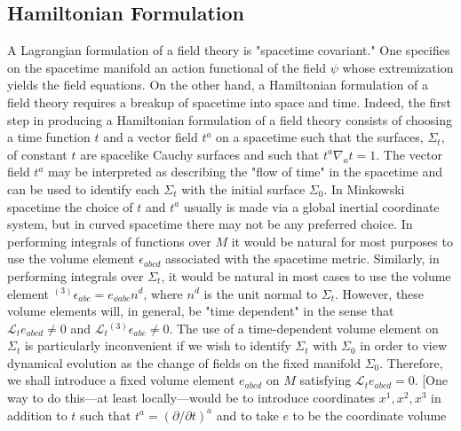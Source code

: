 
\subsection{Hamiltonian Formulation}\label{sec:E.2}

A Lagrangian formulation of a field theory is "spacetime covariant." One specifies
on the spacetime manifold an action functional of the field \(\psi\) whose
extremization yields the field equations. On the other hand, a Hamiltonian
formulation of a field theory requires a breakup of spacetime into space and time.
Indeed, the first step in producing a Hamiltonian formulation of a field theory
consists of choosing a time function \(t\) and a vector field \(t^a\) on a spacetime
such that the surfaces, \(\Sigma_t\), of constant \(t\) are spacelike Cauchy surfaces
and such that \(t^a\nabla_a t=1\). The vector field \(t^a\) may be interpreted as
describing the "flow of time" in the spacetime and can be used to identify each
\(\Sigma_t\) with the initial surface \(\Sigma_0\). In Minkowski spacetime the choice
of \(t\) and \(t^a\) usually is made via a global inertial coordinate system, but in
curved spacetime there may not be any preferred choice. In performing integrals of
functions over \(M\) it would be natural for most purposes to use the volume element
\(\epsilon_{abcd}\) associated with the spacetime metric. Similarly, in performing
integrals over \(\Sigma_t\), it would be natural in most cases to use the volume
element \({}^{(3)}\epsilon_{abc}=e_{\dd abc}n^d\), where \(n^d\) is the unit normal to
\(\Sigma_t\). However, these volume elements will, in general, be "time dependent"
in the sense that \(\mathcal L_t e_{abcd}\ne0\) and
\(\mathcal L_t{}^{(3)}\epsilon_{abc}\ne0\). The use of a time-dependent volume
element on \(\Sigma_t\) is particularly inconvenient if we wish to identify
\(\Sigma_t\) with \(\Sigma_0\) in order to view dynamical evolution as the change of
fields on the fixed manifold \(\Sigma_0\). Therefore, we shall introduce a fixed
volume element \(e_{abcd}\) on \(M\) satisfying \(\mathcal L_t e_{abcd}=0\). [One
way to do this---at least locally---would be to introduce coordinates
\(x^1,x^2,x^3\) in addition to \(t\) such that
\(t^a=(\partial/\partial t)^a\) and to take \(e\) to be the coordinate volume
